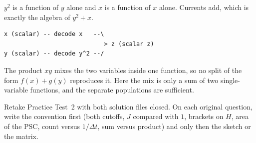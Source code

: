 \documentclass[11pt,letterpaper]{article}
\newcommand{\ans}[1]{\par\vspace{2pt}{\bfseries #1}\quad}
\begin{document}
\ans{3.}
$y^2$ is a function of $y$ alone and $x$ is a function of $x$ alone. Currents add, which is exactly the algebra of $y^2 + x$.
\begin{result}
\begin{verbatim}
x (scalar) -- decode x   --\
                            > z (scalar z)
y (scalar) -- decode y^2 --/
\end{verbatim}
\end{result}
The product $xy$ mixes the two variables inside one function, so no split of the form $f(x) + g(y)$ reproduces it. Here the mix is only a sum of two single-variable functions, and the separate populations are sufficient.

\vspace{8pt}
Retake Practice Test~2 with both solution files closed. On each original question, write the convention first (both cutoffs, $J$ compared with $1$, brackets on $H$, area of the PSC, count versus $1/\Delta t$, sum versus product) and only then the sketch or the matrix.
\end{document}
